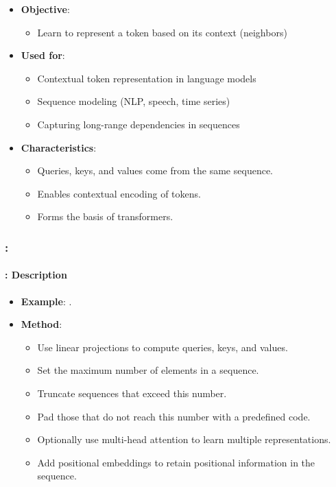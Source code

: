 \documentclass[xcolor=table]{beamer}
\begin{document}
	\begin{subsectionframe}
		\begin{itemize}
			\item \textbf{Objective}:
			\begin{itemize}
				\item Learn to represent a token based on its context (neighbors)
			\end{itemize}
			
			\item \textbf{Used for}:
			\begin{itemize}
				\item Contextual token representation in language models
				\item Sequence modeling (NLP, speech, time series)
				\item Capturing long-range dependencies in sequences
			\end{itemize}
			
			\item \textbf{Characteristics}:
			\begin{itemize}
				\item Queries, keys, and values come from the same sequence.
				\item Enables contextual encoding of tokens.
				\item Forms the basis of transformers.
			\end{itemize}
		\end{itemize}
	\end{subsectionframe}
	
	\begin{frame}
		\frametitle{\insertshortsubtitle: \insertsection}
		\framesubtitle{\insertsubsection: Description}
		
		\begin{itemize}
			\item \textbf{Example}: .
			\item \textbf{Method}:
			\begin{itemize}
				\item Use linear projections to compute queries, keys, and values.
				\item Set the maximum number of elements in a sequence.
				\item Truncate sequences that exceed this number.
				\item Pad those that do not reach this number with a predefined code.
				\item Optionally use multi-head attention to learn multiple representations.
				\item Add positional embeddings to retain positional information in the sequence.
			\end{itemize}
		\end{itemize}
		
	\end{frame}
	
\end{document}
